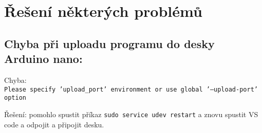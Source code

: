 \section{Řešení některých problémů}
 \subsection{Chyba při uploadu programu do desky Arduino nano:}
 
 Chyba: \\
 {\tt  Please specify 'upload\_port' environment or use global '--upload-port' option}
 
 Řešení: pomohlo spustit příkaz {\tt sudo service udev restart} a znovu spustit VS code a odpojit a připojit desku.  